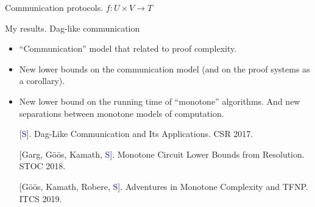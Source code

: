 \begin{frame}{Communication protocols. $f\colon U \times V \to T$}
    \begin{center}
    	    
    \end{center}

    \pause
    \pause
    \pause
\end{frame}

\begin{frame}{My results. Dag-like communication}
    \begin{itemize}   
        \item ``Communication'' model that related to proof complexity.
        \pause
        \item New lower bounds on the communication model (and on the proof systems as a corollary).
        \pause
        \item New lower bound on the running time of ``monotone'' algorithms. And new separations between
            monotone models of computation.
    \end{itemize}

    \pause
    \begin{enumerate}
        \item[] [\textcolor{blue}{S}]. Dag-Like Communication and Its Applications. CSR 2017.
        \item[] [Garg, G\"{o}\"{o}s, Kamath, \textcolor{blue}{S}]. Monotone Circuit Lower Bounds from
            Resolution. STOC 2018.
        \item[] [G\"{o}\"{o}s, Kamath, Robere, \textcolor{blue}{S}]. Adventures in Monotone Complexity and
            TFNP. ITCS 2019.
    \end{enumerate}
\end{frame}

